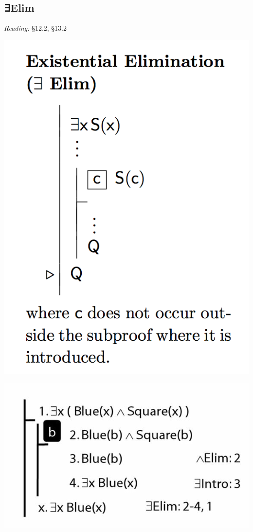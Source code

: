 \documentclass[12pt]{extarticle}
\begin{document}
\begin{multicols*}{3}
 
\section{∃Elim}
 
\emph{Reading:} §12.2, §13.2
 
\begin{center}
\includegraphics[scale=0.3]{img/rule_existential_elim.png}
\end{center}
\begin{center}
\includegraphics[scale=0.3]{img/proof_existential_elim.png}
\end{center}
\begin{minipage}{\columnwidth}
 

\end{minipage}
\end{multicols*}
\end{document}
